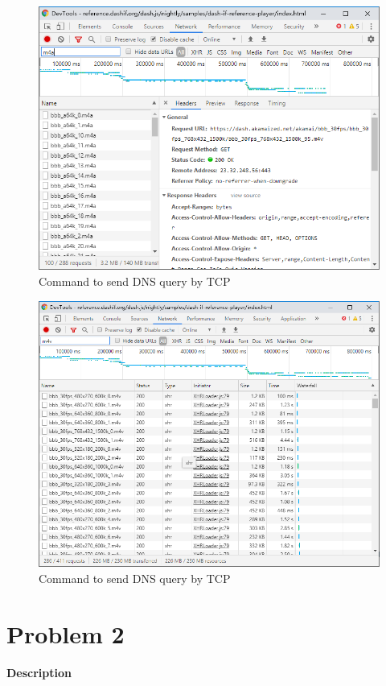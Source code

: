 \documentclass[12pt,letterpaper]{ctexart}
\begin{document}
\begin{itemize}
  \begin{figure}[H]
    \centering
    \includegraphics[width=0.8\linewidth]{assets/6.1_m4a.png}
    \caption{Command to send DNS query by TCP}
    \label{fig:cmd_tcp}
  \end{figure}

  \begin{figure}[H]
    \centering
    \includegraphics[width=0.8\linewidth]{assets/6.1_m4v.png}
    \caption{Command to send DNS query by TCP}
    \label{fig:cmd_tcp}
  \end{figure}
\end{itemize}


\newpage

\section*{Problem 2}

{\bf Description}
\end{document}
